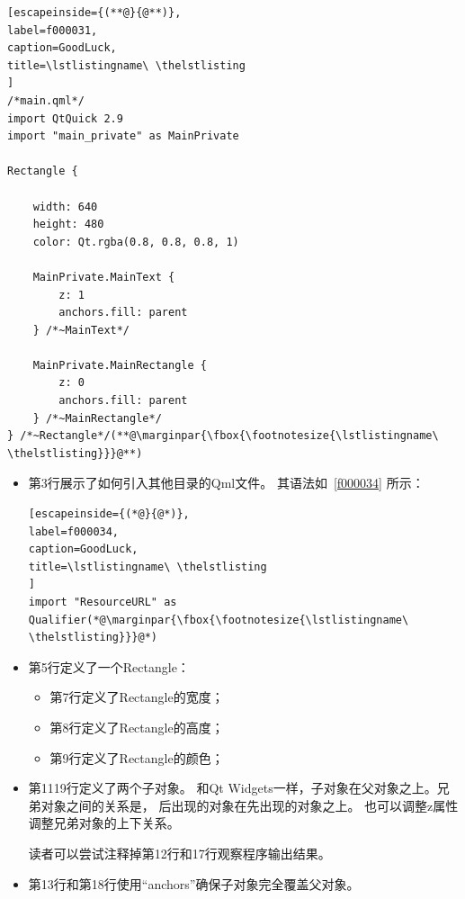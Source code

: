 \FloatBarrier
\begin{lstlisting}[escapeinside={(**@}{@**)},
label=f000031,
caption=GoodLuck,
title=\lstlistingname\ \thelstlisting
]
/*main.qml*/
import QtQuick 2.9
import "main_private" as MainPrivate

Rectangle {

    width: 640
    height: 480
    color: Qt.rgba(0.8, 0.8, 0.8, 1)

    MainPrivate.MainText {
        z: 1
        anchors.fill: parent
    } /*~MainText*/

    MainPrivate.MainRectangle {
        z: 0
        anchors.fill: parent
    } /*~MainRectangle*/
} /*~Rectangle*/(**@\marginpar{\fbox{\footnotesize{\lstlistingname\ \thelstlisting}}}@**)\end{lstlisting}          %

\begin{itemize}

\item 第3行展示了如何引入其他目录的Qml文件。
其语法如\lstlistingname\ \ref{f000034}
所示：

\FloatBarrier
\begin{lstlisting}[escapeinside={(*@}{@*)},
label=f000034,
caption=GoodLuck,
title=\lstlistingname\ \thelstlisting
]
import "ResourceURL" as Qualifier(*@\marginpar{\fbox{\footnotesize{\lstlistingname\ \thelstlisting}}}@*)\end{lstlisting}          %

\item 第5行定义了一个Rectangle：


\begin{itemize}
\item 第7行定义了Rectangle的宽度；
\item 第8行定义了Rectangle的高度；
\item 第9行定义了Rectangle的颜色；
\end{itemize}

\item 第11\raisebox{0.16ex}{\sourcefonttwo\~{}}19行定义了两个子对象。
和Qt Widgets一样，子对象在父对象之上。兄弟对象之间的关系是，
后出现的对象在先出现的对象之上。
也可以调整z属性调整兄弟对象的上下关系。

读者可以尝试注释掉第12行和17行观察程序输出结果。


\item 第13行和第18行使用“anchors”确保子对象完全覆盖父对象。

\end{itemize}

